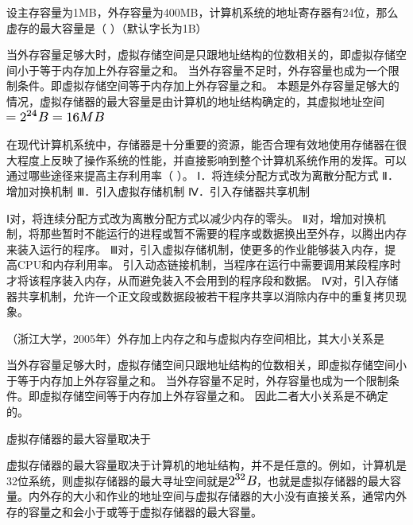 \question 设主存容量为1MB，外存容量为400MB，计算机系统的地址寄存器有24位，那么虚存的最大容量是（
）（默认字长为1B）
\par{}
\begin{solution}当外存容量足够大时，虚拟存储空间是只跟地址结构的位数相关的，即虚拟存储空间小于等于内存加上外存容量之和。
当外存容量不足时，外存容量也成为一个限制条件。即虚拟存储空间等于内存加上外存容量之和。
本题是外存容量足够大的情况，虚拟存储器的最大容量是由计算机的地址结构确定的，其虚拟地址空间\includegraphics[width=1.28125in,height=0.16667in]{texmath/3bdb835Cdpi7B3507D3D25E7B247DB3D16MB}
\end{solution}
\question 在现代计算机系统中，存储器是十分重要的资源，能否合理有效地使用存储器在很大程度上反映了操作系统的性能，并直接影响到整个计算机系统作用的发挥。可以通过哪些途径来提高主存利用率（
）。 Ⅰ．将连续分配方式改为离散分配方式 Ⅱ．增加对换机制
Ⅲ．引入虚拟存储机制 Ⅳ．引入存储器共享机制
\par{}
\begin{solution}Ⅰ对，将连续分配方式改为离散分配方式以减少内存的零头。
Ⅱ对，增加对换机制，将那些暂时不能运行的进程或暂不需要的程序或数据换出至外存，以腾出内存来装入运行的程序。
Ⅲ对，引入虚拟存储机制，使更多的作业能够装入内存，提高CPU和内存利用率。
引入动态链接机制，当程序在运行中需要调用某段程序时才将该程序装入内存，从而避免装入不会用到的程序段和数据。
Ⅳ对，引入存储器共享机制，允许一个正文段或数据段被若干程序共享以消除内存中的重复拷贝现象。
\end{solution}
\question （浙江大学，2005年）外存加上内存之和与虚拟内存空间相比，其大小关系是
\par{}
\begin{solution}当外存容量足够大时，虚拟存储空间只跟地址结构的位数相关，即虚拟存储空间小于等于内存加上外存容量之和。
当外存容量不足时，外存容量也成为一个限制条件。即虚拟存储空间等于内存加上外存容量之和。
因此二者大小关系是不确定的。
\end{solution}
\question 虚拟存储器的最大容量取决于
\par{}
\begin{solution}虚拟存储器的最大容量取决于计算机的地址结构，并不是任意的。例如，计算机是32位系统，则虚拟存储器的最大寻址空间就是\includegraphics[width=0.36458in,height=0.15625in]{texmath/af718c5Cdpi7B3507D25E7B327DB}，也就是虚拟存储器的最大容量。内外存的大小和作业的地址空间与虚拟存储器的大小没有直接关系，通常内外存的容量之和会小于或等于虚拟存储器的最大容量。
\end{solution}
